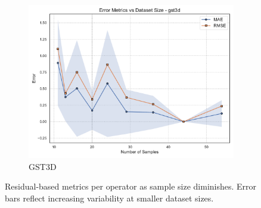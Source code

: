 \begin{figure}[htbp]
\begin{subfigure}[t]{0.32\textwidth}
        \includegraphics[width=\textwidth]{assets/images/05/residual_metrics_by_sample_size_gst3d}
        \caption{\ac{GST3D}}
    \end{subfigure}
    \caption{Residual-based metrics per operator as sample size diminishes.
    Error bars reflect increasing variability at smaller dataset sizes.}
    \label{fig:residual_metrics_by_sample_size_operators}
\end{figure}

